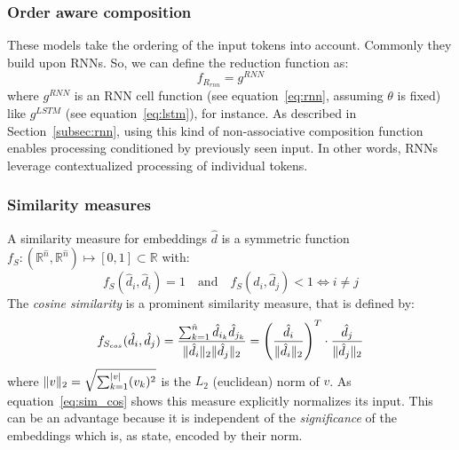 \subsubsection*{Order aware composition} \label{subsec:order_aware_composition}
These models take the ordering of the input tokens into account. Commonly they build upon \acfp{RNN}. So, we can define the reduction function as:
\begin{equation}
f_{R_{rnn}} = g^{RNN}
\end{equation}
where $g^{RNN}$ is an \ac{RNN} cell function (see equation~\eqref{eq:rnn}, assuming $\theta$ is fixed) like $g^{LSTM}$ (see equation~\eqref{eq:lstm}), for instance. As described in Section~\ref{subsec:rnn}, using this kind of non-associative composition function enables processing conditioned by previously seen input. In other words, \acp{RNN} leverage contextualized processing of individual tokens.

\subsubsection{Similarity measures}
\label{subsec:similarity_measure}
A similarity measure for embeddings $\hat{d}$ is a symmetric function $f_S: (\mathbb{R}^{\hat{n}}, \mathbb{R}^{\hat{n}}) \mapsto [0, 1] \subset \mathbb{R}$ with:
\begin{equation}
f_S(\hat{d}_i, \hat{d}_i) = 1 \quad \text{and} \quad f_S(\hat{d}_i, \hat{d}_j) < 1 \Leftrightarrow i \neq j
\end{equation}
The \textit{cosine similarity} is a prominent similarity measure, that is defined by:
\begin{equation} \label{eq:sim_cos}
f_{S_{cos}}(\hat{d}_i, \hat{d}_j) = \frac{\sum_{k=1}^{\hat{n}}\hat{d}_{i_k} \hat{d}_{j_k}}{\lVert\hat{d}_i\rVert_2 \lVert\hat{d}_j\rVert_2} = \left(\frac{\hat{d}_i}{\lVert\hat{d}_i\rVert_2}\right)^T \cdot \frac{\hat{d}_j}{\lVert\hat{d}_j\rVert_2}
\end{equation}
where $\lVert v\rVert_2 = \sqrt{\sum_{k=1}^{|v|}(v_k)^2}$ is the $L_2$ (euclidean) norm of $v$. As equation~\eqref{eq:sim_cos} shows this measure explicitly normalizes its input. This can be an advantage because it is independent of the \textit{significance} of the embeddings which is, as \textcite{schakel_measuring_2015} state, encoded by their norm.

